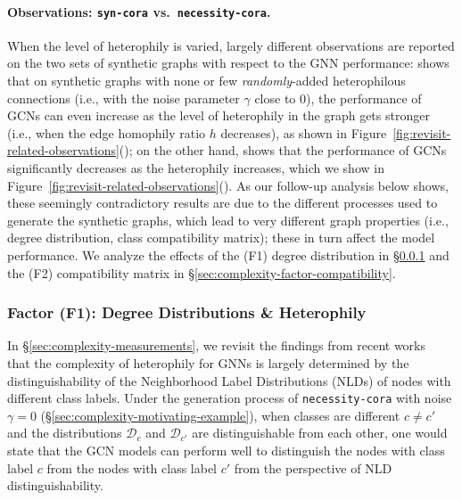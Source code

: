\paragraph{Observations: \texttt{syn-cora} vs.~\texttt{necessity-cora}.} 
When the level of heterophily is varied, 
largely different observations are reported on the two sets of synthetic graphs with respect to the GNN performance:
\cite{ma2021homophily} shows that on synthetic graphs with none or few \emph{randomly}-added heterophilous connections (i.e., with the noise parameter $\gamma$ close to 0),
the performance of GCNs can even increase as the level of heterophily in the graph gets stronger (i.e., when the edge homophily ratio $h$ decreases), as shown in Figure~\ref{fig:revisit-related-observations}();
on the other hand, \cite{zhu2020beyond} shows that the performance of GCNs significantly decreases 
as the heterophily increases, which we show in Figure~\ref{fig:revisit-related-observations}().
As our follow-up analysis below shows, these seemingly contradictory results are due to the different processes used to generate the synthetic graphs, which lead to very different graph properties (i.e., degree distribution, class compatibility matrix); these in turn affect the model performance.
We analyze the effects of the (F1) degree distribution in \S\ref{sec:complexity-factor-degree} and the (F2) compatibility matrix in \S\ref{sec:complexity-factor-compatibility}.

\subsubsection{Factor (F1): Degree Distributions \& Heterophily}
\label{sec:complexity-factor-degree}

In \S\ref{sec:complexity-measurements}, we revisit the findings from recent works~\cite{ma2021homophily,luan2022revisiting} that the complexity of heterophily for GNNs is largely determined by the distinguishability of the Neighborhood Label Distributions (NLDs) of nodes with different class labels. 
Under the generation process of \texttt{necessity-cora} with noise $\gamma=0$ (\S\ref{sec:complexity-motivating-example}), when classes are different $c \neq c'$ and the distributions $\mathcal{D}_{c}$ and $ \mathcal{D}_{c'} $ are distinguishable from each other, one would state that the GCN models can perform well to distinguish the nodes with class label $c$ from the nodes with class label $c'$ from the perspective of NLD distinguishability.



